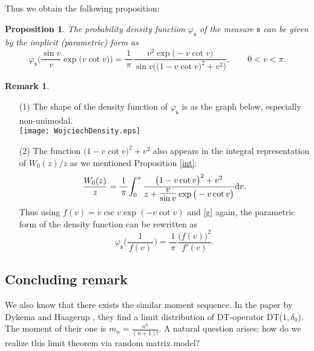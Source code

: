 \documentclass[12pt]{amsart}
\newtheorem{prop}[thm]{Proposition}
\theoremstyle{definition}
\newtheorem{rem}[thm]{Remark}
\numberwithin{equation}{section}
\begin{document}
Thus we obtain the following proposition:
\begin{prop}
The probability density function $\varphi_{\mathfrak{s}}$ of the measure ${\mathfrak{s}}$ 
can be given by the implicit (parametric) form as
\[
   \varphi_{\mathfrak{s}} \Big( \frac{\sin v}{v} \exp \big( v \cot v \big) \Big)
 = \frac{1}{\, \pi \,} 
       \frac{v^2 \exp \big( - v \cot v \big) }
       {\sin v 
          \Big( \big(1 - v \cot v \big)^2  + v^2 \Big)},
 \qquad 0 < v < \pi.
\]
\end{prop}
\begin{rem}
\begin{itemize}
\item[(1)]{The shape of the density function of $\varphi_{\mathfrak{s}}$ is as the graph below, especially non-unimodal.}\\
\texttt{[image: WojciechDensity.eps]}
\item[(2)]{The function $\big(1 - v \cot v \big)^2  + v^2$ also 
appears in the integral representation of $W_0(z)/z$ as we mentioned Proposition \ref{int}:
$$
 \frac{W_0(z)}{z} = \frac{1}{\, \pi \,} \! \int_{0}^{\pi} 
        \frac{\big(1 - v \cot v \big)^2  + v^2 }{z + 
            \mbox{\Large $\frac{v}{\sin v}$} \exp \big( - v \cot v \big)} 
      \mathrm{d} v.
$$
Thus
using $f(v)=v \csc v \exp ( - v \cot v )$ and \eqref{g} again,
the parametric form of the density function can be rewritten as 
$$
  \varphi_{\mathfrak{s}} \Big( \frac{1}{\, f(v) \,} \Big) 
 = \frac{1}{\, \pi \,} \frac{\big( f(v) \big)^2}{ f'(v) }.
$$
}
\end{itemize}
\end{rem}
	\subsection{Concluding remark}
	We also know that there exists the similar moment sequence.
	In the paper by Dykema and Haagerup \cite{DyHa04}, 
	they find a limit distribution of DT-operator DT($1,\delta_{0}$).
	The moment of their one is $m_{n}=\frac{n^{n}}{(n+1)!}$.
	A natural question arises: how do we realize this limit theorem via random matrix model?
\end{document}
